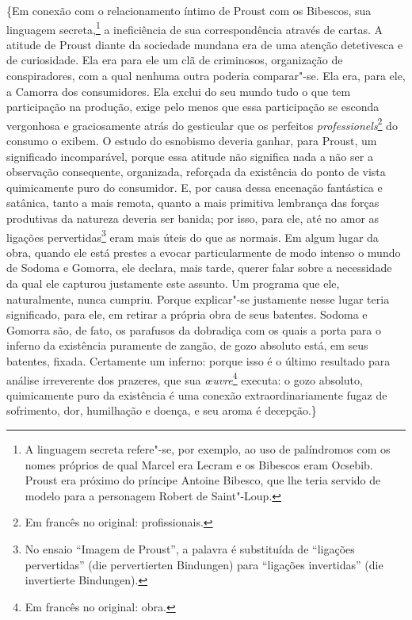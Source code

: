 \{Em conexão com o relacionamento íntimo de Proust com os Bibescos, sua
linguagem secreta,\footnote{A linguagem secreta refere"-se, por exemplo, \label{bibescos}
  ao uso de palíndromos com os nomes próprios de qual Marcel era Lecram
  e os Bibescos eram Ocsebib. Proust era próximo do príncipe Antoine
  Bibesco, que lhe teria servido de modelo para a personagem Robert de
  Saint"-Loup.} a ineficiência de sua correspondência através de cartas.
A atitude de Proust diante da sociedade mundana era de uma atenção
detetivesca e de curiosidade. Ela era para ele um clã de criminosos,
organização de conspiradores, com a qual nenhuma outra poderia
comparar"-se. Ela era, para ele, a Camorra dos consumidores. Ela exclui
do seu mundo tudo o que tem participação na produção, exige pelo menos
que essa participação se esconda vergonhosa e graciosamente atrás do
gesticular que os perfeitos \emph{professionels}\footnote{Em francês no original:
  profissionais. \versal{[N. T.]}} do consumo o exibem. O estudo do esnobismo deveria
ganhar, para Proust, um significado incomparável, porque essa atitude
não significa nada a não ser a observação consequente, organizada,
reforçada da existência do ponto de vista quimicamente puro do
consumidor. E, por causa dessa encenação fantástica e satânica, tanto a
mais remota, quanto a mais primitiva lembrança das forças produtivas da
natureza deveria ser banida; por isso, para ele, até no amor as ligações
pervertidas\footnote{No ensaio ``Imagem de Proust'', a palavra
  é substituída de ``ligações pervertidas'' (die pervertierten Bindungen) para ``ligações invertidas'' (die
  invertierte Bindungen). \versal{[N. E.]}} eram mais úteis do que as normais. Em algum
lugar da obra, quando ele está prestes a evocar particularmente de modo
intenso o mundo de Sodoma e Gomorra, ele declara, mais tarde, querer
falar sobre a necessidade da qual ele capturou justamente este assunto.
Um programa que ele, naturalmente, nunca cumpriu. Porque explicar"-se
justamente nesse lugar teria significado, para ele, em retirar a própria
obra de seus batentes. Sodoma e Gomorra são, de fato, os parafusos da
dobradiça com os quais a porta para o inferno da existência puramente de
zangão, de gozo absoluto está, em seus batentes, fixada. Certamente um
inferno: porque isso é o último resultado para análise irreverente dos
prazeres, que sua \emph{œuvre}\footnote{Em francês no original:
  obra. \versal{[N. T.]}} executa: o gozo absoluto, quimicamente puro da existência é uma
conexão extraordinariamente fugaz de sofrimento, dor, humilhação e
doença, e seu aroma é decepção.\}

